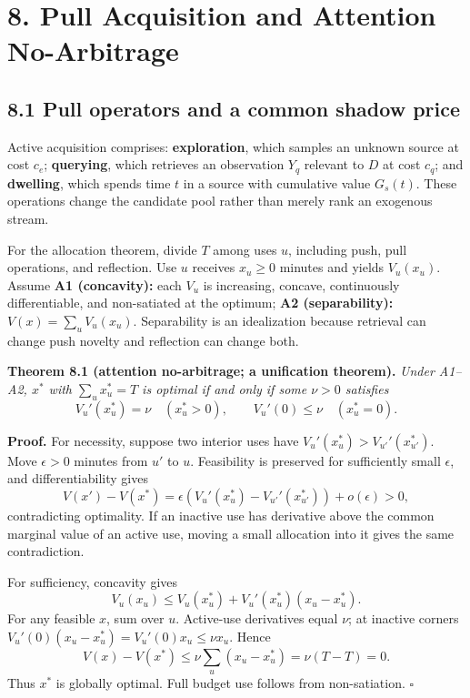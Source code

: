 \documentclass[
  11pt]{article}
\begin{document}
\section{8. Pull Acquisition and Attention No-Arbitrage}\label{pull-acquisition-and-attention-no-arbitrage}

\subsection{8.1 Pull operators and a common shadow price}\label{pull-operators-and-a-common-shadow-price}

Active acquisition comprises: \textbf{exploration}, which samples an unknown source at cost \(c_e\); \textbf{querying}, which retrieves an observation \(Y_q\) relevant to \(D\) at cost \(c_q\); and \textbf{dwelling}, which spends time \(t\) in a source with cumulative value \(G_s(t)\). These operations change the candidate pool rather than merely rank an exogenous stream.

For the allocation theorem, divide \(T\) among uses \(u\), including push, pull operations, and reflection. Use \(u\) receives \(x_u\geq0\) minutes and yields \(V_u(x_u)\). Assume \textbf{A1 (concavity):} each \(V_u\) is increasing, concave, continuously differentiable, and non-satiated at the optimum; \textbf{A2 (separability):} \(V(x)=\sum_uV_u(x_u)\). Separability is an idealization because retrieval can change push novelty and reflection can change both.

\textbf{Theorem 8.1 (attention no-arbitrage; a unification theorem).} \emph{Under A1--A2, \(x^*\) with \(\sum_ux_u^*=T\) is optimal if and only if some \(\nu>0\) satisfies} \[
V_u'(x_u^*)=\nu\quad(x_u^*>0),
\qquad
V_u'(0)\leq\nu\quad(x_u^*=0).
\tag{17}
\]

\textbf{Proof.} For necessity, suppose two interior uses have \(V_u'(x_u^*)>V_{u'}'(x_{u'}^*)\). Move \(\epsilon>0\) minutes from \(u'\) to \(u\). Feasibility is preserved for sufficiently small \(\epsilon\), and differentiability gives \[
V(x')-V(x^*)=\epsilon(V_u'(x_u^*)-V_{u'}'(x_{u'}^*))+o(\epsilon)>0,
\] contradicting optimality. If an inactive use has derivative above the common marginal value of an active use, moving a small allocation into it gives the same contradiction.

For sufficiency, concavity gives \[
V_u(x_u)\leq V_u(x_u^*)+V_u'(x_u^*)(x_u-x_u^*).
\] For any feasible \(x\), sum over \(u\). Active-use derivatives equal \(\nu\); at inactive corners \(V_u'(0)(x_u-x_u^*)=V_u'(0)x_u\leq\nu x_u\). Hence \[
V(x)-V(x^*)\leq\nu\sum_u(x_u-x_u^*)=\nu(T-T)=0.
\] Thus \(x^*\) is globally optimal. Full budget use follows from non-satiation. \(\square\)
\end{document}
